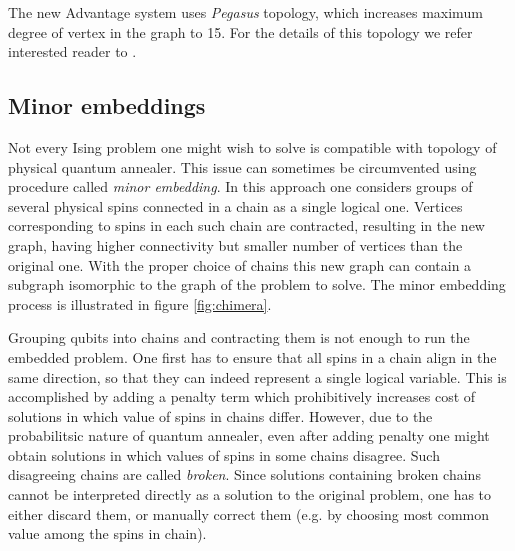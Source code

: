 The new Advantage system uses \emph{Pegasus} topology, which increases maximum degree of vertex in the graph to 15. For the details of this topology we refer interested reader to \cite{boothby}.

\subsection{Minor embeddings}
Not every Ising problem one might wish to solve is compatible with topology of physical quantum annealer. This issue can sometimes be circumvented using procedure called \emph{minor embedding}. In this approach one considers groups of several physical spins connected in a chain as a single logical one. Vertices corresponding to spins in each such chain are contracted, resulting in the new graph, having higher connectivity but smaller number of vertices than the original one. With the proper choice of chains this new graph can contain a subgraph isomorphic to the graph of the problem to solve. The minor embedding process is illustrated in figure \ref{fig:chimera}.

Grouping qubits into chains and contracting them is not enough to run the embedded problem. One first has to ensure that all spins in a chain align in the same direction, so that they can indeed represent a single logical variable. This is accomplished by adding a penalty term which prohibitively increases cost of solutions in which value of spins in chains differ. However, due to the probabilitsic nature of quantum annealer, even after adding penalty one might obtain solutions in which values of spins in some chains disagree. Such disagreeing chains are called \emph{broken}. Since solutions containing broken chains cannot be interpreted directly as a solution to the original problem, one has to either discard them, or manually correct them (e.g. by choosing most common value among the spins in chain).


